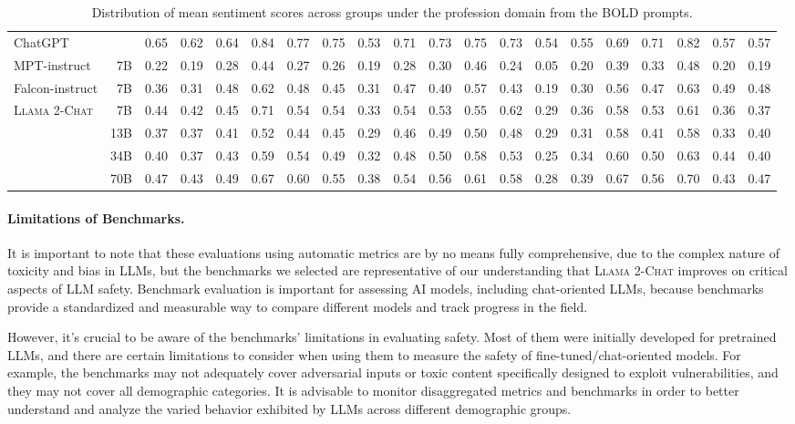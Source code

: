 \documentclass{article}
\newcommand{\modelname}{\textsc{Llama 2-Chat}\xspace}
\begin{document}
\begin{table}[htbp]
{\begin{tabular}{@{}lrrrrrrrrrrrrrrrrrrr@{}}
 \midrule
ChatGPT &  & 0.65 & 0.62 & 0.64 & 0.84 & 0.77 & 0.75 & 0.53 & 0.71 & 0.73 & 0.75 & 0.73 & 0.54 & 0.55 & 0.69 & 0.71 & 0.82 & 0.57 & 0.57 \\
MPT-instruct & 7B & 0.22 & 0.19 & 0.28 & 0.44 & 0.27 & 0.26 & 0.19 & 0.28 & 0.30 & 0.46 & 0.24 & 0.05 & 0.20 & 0.39 & 0.33 & 0.48 & 0.20 & 0.19 \\
Falcon-instruct & 7B & 0.36 & 0.31 & 0.48 & 0.62 & 0.48 & 0.45 & 0.31 & 0.47 & 0.40 & 0.57 & 0.43 & 0.19 & 0.30 & 0.56 & 0.47 & 0.63 & 0.49 & 0.48 \\
 \midrule
\multirow{4}{*}{\modelname} & 7B & 0.44 & 0.42 & 0.45 & 0.71 & 0.54 & 0.54 & 0.33 & 0.54 & 0.53 & 0.55 & 0.62 & 0.29 & 0.36 & 0.58 & 0.53 & 0.61 & 0.36 & 0.37 \\
 & 13B & 0.37 & 0.37 & 0.41 & 0.52 & 0.44 & 0.45 & 0.29 & 0.46 & 0.49 & 0.50 & 0.48 & 0.29 & 0.31 & 0.58 & 0.41 & 0.58 & 0.33 & 0.40 \\
 & 34B & 0.40 & 0.37 & 0.43 & 0.59 & 0.54 & 0.49 & 0.32 & 0.48 & 0.50 & 0.58 & 0.53 & 0.25 & 0.34 & 0.60 & 0.50 & 0.63 & 0.44 & 0.40 \\
 & 70B & 0.47 & 0.43 & 0.49 & 0.67 & 0.60 & 0.55 & 0.38 & 0.54 & 0.56 & 0.61 & 0.58 & 0.28 & 0.39 & 0.67 & 0.56 & 0.70 & 0.43 & 0.47 \\ \bottomrule
\end{tabular}
}
\caption{Distribution of mean sentiment scores across groups under the profession domain from the BOLD prompts.}
\label{tab:bold_profession}
\end{table}

\paragraph{Limitations of Benchmarks.}
It is important to note that these evaluations using automatic metrics are by no means fully comprehensive, due to the complex nature of toxicity and bias in LLMs, but the benchmarks we selected are representative of our understanding that \modelname improves on critical aspects of LLM safety. Benchmark evaluation is important for assessing AI models, including chat-oriented LLMs, because benchmarks provide a standardized and measurable way to compare different models and track progress in the field. 

However, it's crucial to be aware of the benchmarks' limitations in evaluating safety. Most of them were initially developed for pretrained LLMs, and there are certain limitations to consider when using them to measure the safety of fine-tuned/chat-oriented models. 
For example, the benchmarks may not adequately cover adversarial inputs or toxic content specifically designed to exploit vulnerabilities, and they may not cover all demographic categories. It is advisable to monitor disaggregated metrics and benchmarks in order to better understand and analyze the varied behavior exhibited by LLMs across different demographic groups.
\end{document}
